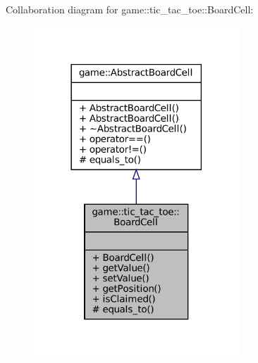 Collaboration diagram for game\+:\+:tic\+\_\+tac\+\_\+toe\+:\+:Board\+Cell\+:
\nopagebreak
\begin{figure}[H]
\begin{center}
\leavevmode
\includegraphics[width=218pt]{classgame_1_1tic__tac__toe_1_1_board_cell__coll__graph}
\end{center}
\end{figure}
